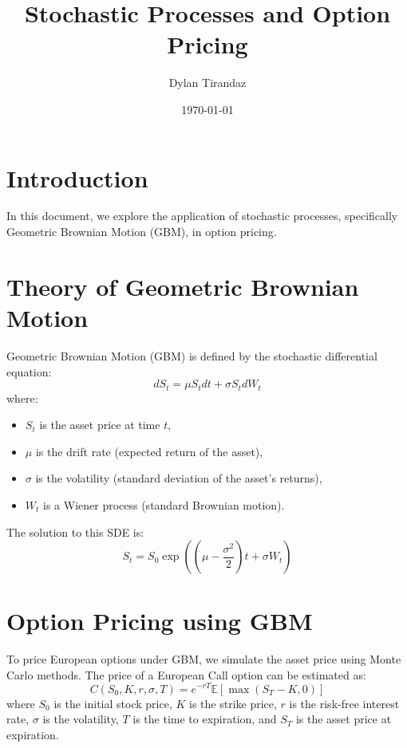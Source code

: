 \documentclass{article}
\title{Stochastic Processes and Option Pricing}
\author{Dylan Tirandaz}
\date{\today}
\begin{document}
\maketitle

\section{Introduction}

In this document, we explore the application of stochastic processes, specifically Geometric Brownian Motion (GBM), in option pricing.

\section{Theory of Geometric Brownian Motion}

Geometric Brownian Motion (GBM) is defined by the stochastic differential equation:
\begin{equation}
dS_t = \mu S_t dt + \sigma S_t dW_t
\end{equation}
where:
\begin{itemize}
    \item \( S_t \) is the asset price at time \( t \),
    \item \( \mu \) is the drift rate (expected return of the asset),
    \item \( \sigma \) is the volatility (standard deviation of the asset's returns),
    \item \( W_t \) is a Wiener process (standard Brownian motion).
\end{itemize}

The solution to this SDE is:
\begin{equation}
S_t = S_0 \exp \left( \left( \mu - \frac{\sigma^2}{2} \right)t + \sigma W_t \right)
\end{equation}

\section{Option Pricing using GBM}

To price European options under GBM, we simulate the asset price using Monte Carlo methods. The price of a European Call option can be estimated as:
\begin{equation}
C(S_0, K, r, \sigma, T) = e^{-rT} \mathbb{E} \left[ \max(S_T - K, 0) \right]
\end{equation}
where \( S_0 \) is the initial stock price, \( K \) is the strike price, \( r \) is the risk-free interest rate, \( \sigma \) is the volatility, \( T \) is the time to expiration, and \( S_T \) is the asset price at expiration.
\end{document}

